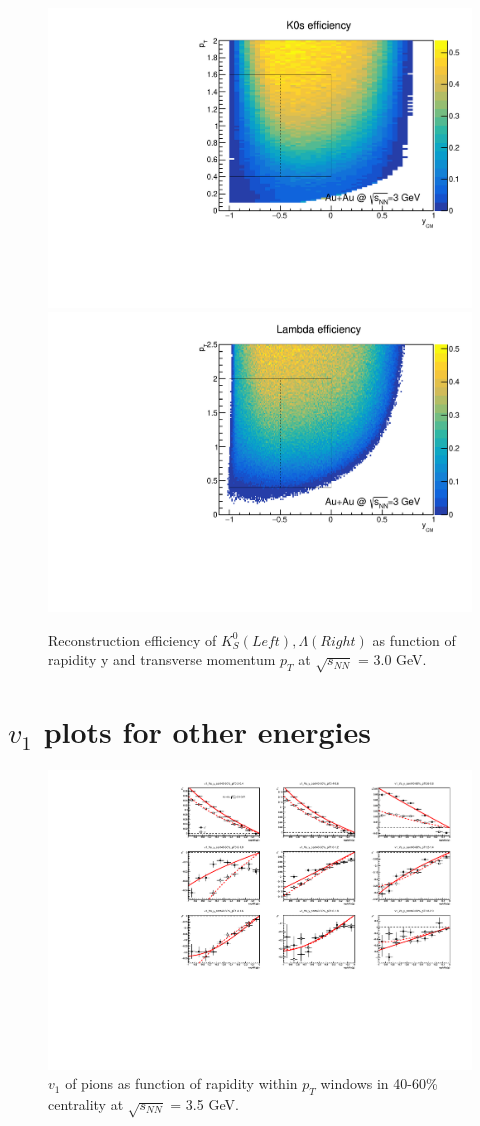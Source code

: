 \begin{figure}[hbt!]
\centering
\includegraphics[width=0.45\linewidth]{figures/chapter02/3gev_K0s_eff.pdf}
\includegraphics[width=0.45\linewidth]{figures/chapter02/3gev_lambda_eff.pdf}
\caption{Reconstruction efficiency of $K^{0}_{S}(Left), \Lambda(Right)$ as function of rapidity y and transverse momentum $p_T$ at $\sqrt{s_{NN}}$ = 3.0 GeV.}
\label{fig:3gev_K0sLam_eff}
\end{figure}

\section{$v_1$ plots for other energies}

\begin{figure}[hbt!]
\centering
\includegraphics[width=0.85\linewidth]{figures/chapter03/3p5gev_pionp_v1VSy_9pT_cent0.pdf}
\caption{$v_1$ of pions as function of rapidity within $p_T$ windows in 40-60\% centrality at $\sqrt{s_{NN}}$ = 3.5 GeV.}
\label{fig:3p5gev_pion_v1y_pt_cent0}
\end{figure}

